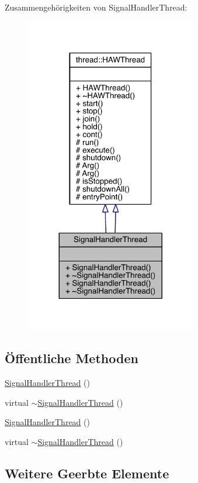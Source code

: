 Zusammengehörigkeiten von Signal\+Handler\+Thread\+:
\nopagebreak
\begin{figure}[H]
\begin{center}
\leavevmode
\includegraphics[width=212pt]{class_signal_handler_thread__coll__graph}
\end{center}
\end{figure}
\subsection*{Öffentliche Methoden}
\begin{DoxyCompactItemize}
\item 
\hyperlink{class_signal_handler_thread_ab78029caf852fcaa1d4c1d22ae1432fd}{Signal\+Handler\+Thread} ()
\item 
virtual \hyperlink{class_signal_handler_thread_a414c6ca3b03db6f0fa9bf24957421bf4}{$\sim$\+Signal\+Handler\+Thread} ()
\item 
\hyperlink{class_signal_handler_thread_ab78029caf852fcaa1d4c1d22ae1432fd}{Signal\+Handler\+Thread} ()
\item 
virtual \hyperlink{class_signal_handler_thread_ae5f82b0b55704aba1cbf0e06002b2737}{$\sim$\+Signal\+Handler\+Thread} ()
\end{DoxyCompactItemize}
\subsection*{Weitere Geerbte Elemente}


